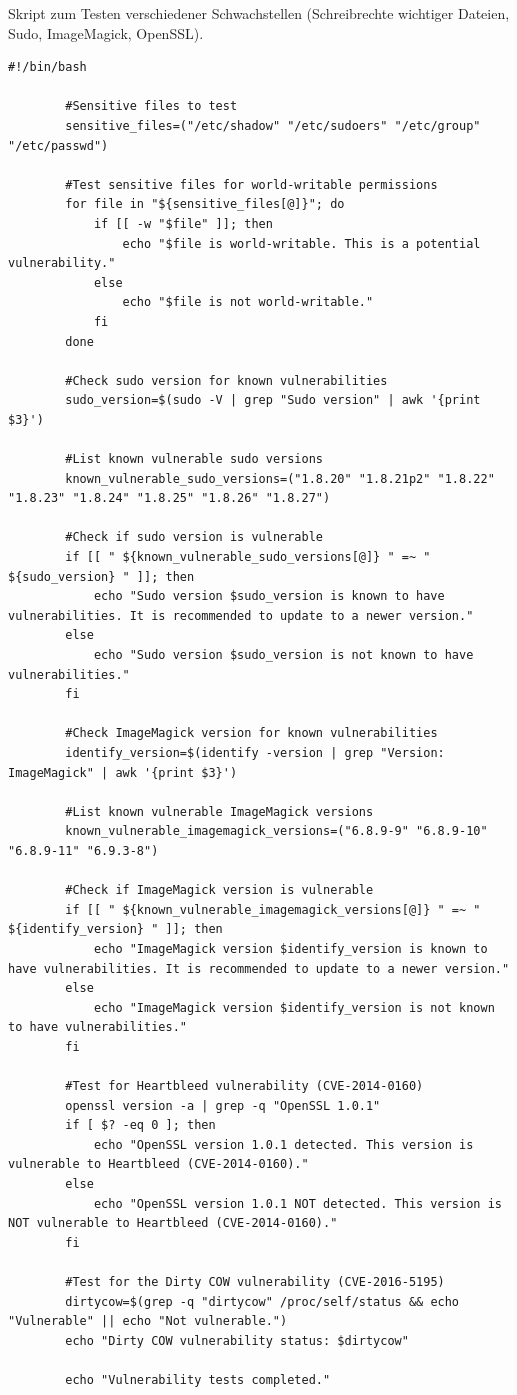 \documentclass[10pt, a4paper,onecolumn ,titlepage]{article}
\begin{document}
    \vspace{1cm}
    \noindent
    Skript zum Testen verschiedener Schwachstellen (Schreibrechte wichtiger Dateien, Sudo, ImageMagick, OpenSSL).
    \begin{lstlisting}[label={lst:schwachstellentestSkript}]
        #!/bin/bash

        #Sensitive files to test
        sensitive_files=("/etc/shadow" "/etc/sudoers" "/etc/group" "/etc/passwd")

        #Test sensitive files for world-writable permissions
        for file in "${sensitive_files[@]}"; do
            if [[ -w "$file" ]]; then
                echo "$file is world-writable. This is a potential vulnerability."
            else
                echo "$file is not world-writable."
            fi
        done

        #Check sudo version for known vulnerabilities
        sudo_version=$(sudo -V | grep "Sudo version" | awk '{print $3}')

        #List known vulnerable sudo versions
        known_vulnerable_sudo_versions=("1.8.20" "1.8.21p2" "1.8.22" "1.8.23" "1.8.24" "1.8.25" "1.8.26" "1.8.27")

        #Check if sudo version is vulnerable
        if [[ " ${known_vulnerable_sudo_versions[@]} " =~ " ${sudo_version} " ]]; then
            echo "Sudo version $sudo_version is known to have vulnerabilities. It is recommended to update to a newer version."
        else
            echo "Sudo version $sudo_version is not known to have vulnerabilities."
        fi

        #Check ImageMagick version for known vulnerabilities
        identify_version=$(identify -version | grep "Version: ImageMagick" | awk '{print $3}')

        #List known vulnerable ImageMagick versions
        known_vulnerable_imagemagick_versions=("6.8.9-9" "6.8.9-10" "6.8.9-11" "6.9.3-8")

        #Check if ImageMagick version is vulnerable
        if [[ " ${known_vulnerable_imagemagick_versions[@]} " =~ " ${identify_version} " ]]; then
            echo "ImageMagick version $identify_version is known to have vulnerabilities. It is recommended to update to a newer version."
        else
            echo "ImageMagick version $identify_version is not known to have vulnerabilities."
        fi

        #Test for Heartbleed vulnerability (CVE-2014-0160)
        openssl version -a | grep -q "OpenSSL 1.0.1"
        if [ $? -eq 0 ]; then
            echo "OpenSSL version 1.0.1 detected. This version is vulnerable to Heartbleed (CVE-2014-0160)."
        else
            echo "OpenSSL version 1.0.1 NOT detected. This version is NOT vulnerable to Heartbleed (CVE-2014-0160)."
        fi

        #Test for the Dirty COW vulnerability (CVE-2016-5195)
        dirtycow=$(grep -q "dirtycow" /proc/self/status && echo "Vulnerable" || echo "Not vulnerable.")
        echo "Dirty COW vulnerability status: $dirtycow"

        echo "Vulnerability tests completed."
    \end{lstlisting}
\end{document}
